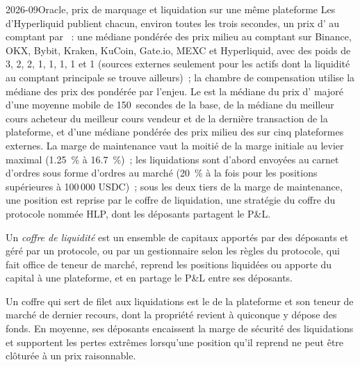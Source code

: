 \begin{dated}{2026-09}{Oracle, prix de marquage et liquidation sur une même plateforme}\label{dat:m3:on-chain-order-books-and-perpetual-dexs:oracle}
Les  d'Hyperliquid publient chacun, environ toutes les trois secondes, un prix d' au comptant par ~: une médiane pondérée des prix milieu
au comptant sur Binance, OKX, Bybit, Kraken, KuCoin, Gate.io, MEXC et Hyperliquid, avec des poids de 3, 2, 2, 1, 1, 1, 1 et 1 (sources externes
seulement pour les actifs dont la liquidité au comptant principale se trouve ailleurs)~; la chambre de compensation utilise la médiane des prix des  pondérée par l'enjeu.
Le  est la médiane du prix d' majoré d'une moyenne mobile de 150~secondes de la base, de la médiane du meilleur cours acheteur
du meilleur cours vendeur et de la dernière transaction de la plateforme, et d'une médiane pondérée des prix milieu des  sur cinq plateformes externes. La marge de maintenance vaut la moitié de la marge initiale
au levier maximal (1.25~\% à 16.7~\%)~; les liquidations sont d'abord envoyées au carnet d'ordres sous forme d'ordres au marché (20~\% à la fois pour les positions
supérieures à 100\,000 USDC)~; sous les deux tiers de la marge de maintenance, une position est reprise par le coffre de liquidation, une stratégie du
coffre du protocole nommée HLP, dont les déposants partagent le P\&L.
\end{dated}

\begin{definition}\label{def:m3:on-chain-order-books-and-perpetual-dexs:vault}
Un \emph{coffre de liquidité} est un ensemble de capitaux apportés par des déposants et géré par un protocole, ou par un gestionnaire selon les règles du protocole,
qui fait office de teneur de marché, reprend les positions liquidées ou apporte du capital à une plateforme, et en partage le P\&L entre ses déposants.
\end{definition}

Un coffre qui sert de filet aux liquidations est le  de la plateforme et son teneur de marché de dernier recours, dont la propriété revient à quiconque y dépose des fonds.
En moyenne, ses déposants encaissent la marge de sécurité des liquidations et supportent les pertes extrêmes lorsqu'une position qu'il reprend ne peut être clôturée à un prix raisonnable.

